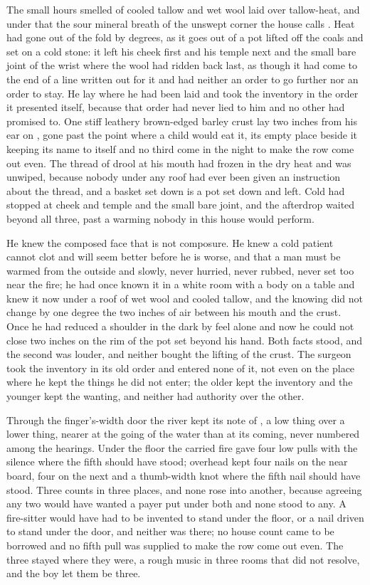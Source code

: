 The small hours smelled of cooled tallow and wet wool laid over tallow-heat, and under that the sour mineral breath of the unswept corner the house calls . Heat had gone out of the fold by degrees, as it goes out of a pot lifted off the coals and set on a cold stone: it left his cheek first and his temple next and the small bare joint of the wrist where the wool had ridden back last, as though it had come to the end of a line written out for it and had neither an order to go further nor an order to stay. He lay where he had been laid and took the inventory in the order it presented itself, because that order had never lied to him and no other had promised to. One stiff leathery brown-edged barley crust lay two inches from his ear on , gone past the point where a child would eat it, its empty place beside it keeping its name to itself and no third come in the night to make the row come out even. The thread of drool at his mouth had frozen in the dry heat and was unwiped, because nobody under any roof had ever been given an instruction about the thread, and a basket set down is a pot set down and left. Cold had stopped at cheek and temple and the small bare joint, and the afterdrop waited beyond all three, past a warming nobody in this house would perform.

He knew the composed face that is not composure. He knew a cold patient cannot clot and will seem better before he is worse, and that a man must be warmed from the outside and slowly, never hurried, never rubbed, never set too near the fire; he had once known it in a white room with a body on a table and knew it now under a roof of wet wool and cooled tallow, and the knowing did not change by one degree the two inches of air between his mouth and the crust. Once he had reduced a shoulder in the dark by feel alone and now he could not close two inches on the rim of the pot set beyond his hand. Both facts stood, and the second was louder, and neither bought the lifting of the crust. The surgeon took the inventory in its old order and entered none of it, not even on the place where he kept the things he did not enter; the older kept the inventory and the younger kept the wanting, and neither had authority over the other.

\scenebreak

Through the finger's-width door the river kept its note of , a low thing over a lower thing, nearer at the going of the water than at its coming, never numbered among the hearings. Under the floor the carried fire gave four low pulls with the silence where the fifth should have stood; overhead  kept four nails on the near board, four on the next and a thumb-width knot where the fifth nail should have stood. Three counts in three places, and none rose into another, because agreeing any two would have wanted a payer put under both and none stood to any. A fire-sitter would have had to be invented to stand under the floor, or a nail driven to stand under the door, and neither was there; no house count came to be borrowed and no fifth pull was supplied to make the row come out even. The three stayed where they were, a rough music in three rooms that did not resolve, and the boy let them be three.

